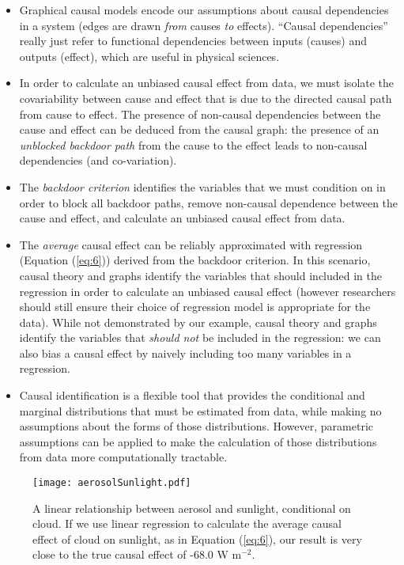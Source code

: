 \documentclass[12pt]{article}
\begin{document}
\begin{itemize}
\item Graphical causal models encode our assumptions about causal
  dependencies in a system (edges are drawn \emph{from} causes \emph{to}
  effects). ``Causal dependencies'' really just refer to functional
  dependencies between inputs (causes) and outputs (effect), which are
  useful in physical sciences.
\item In order to calculate an unbiased causal effect from data, we
  must isolate the covariability between cause and effect that is due
  to the directed causal path from cause to effect. The presence of
  non-causal dependencies between the cause and effect can be deduced
  from the causal graph: the presence of an \textit{unblocked backdoor
    path} from the cause to the effect leads to non-causal
  dependencies (and co-variation).
\item The \emph{backdoor criterion} identifies the variables that we
  must condition on in order to block all backdoor paths, remove
  non-causal dependence between the cause and effect, and calculate an
  unbiased causal effect from data.
\item The \emph{average} causal effect can be reliably approximated
  with regression (Equation (\ref{eq:6})) derived from the backdoor
  criterion. In this scenario, causal theory and graphs identify the
  variables that should included in the regression in order to
  calculate an unbiased causal effect (however researchers should
  still ensure their choice of regression model is appropriate for the
  data). While not demonstrated by our example, causal theory and
  graphs identify the variables that \textit{should not} be included
  in the regression: we can also bias a causal effect by naively
  including too many variables in a regression.
\item Causal identification is a flexible tool that provides the
  conditional and marginal distributions that must be estimated from data,
  while making no assumptions about the forms of those
  distributions. However, parametric assumptions can be applied to
  make the calculation of those distributions from data more
  computationally tractable.
\end{itemize}

\begin{figure} \texttt{[image: aerosolSunlight.pdf]}
  \caption{A linear relationship between aerosol and sunlight,
    conditional on cloud. If we use linear regression to calculate the
    average causal effect of cloud on sunlight, as in Equation
    (\ref{eq:6}), our result is very close to the true causal effect of
    -68.0 W m$^{-2}$.}
  \label{fig:linear}
\end{figure}
\end{document}
